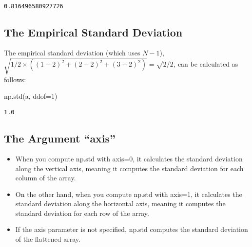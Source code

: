 \documentclass[
  letterpaper,
  DIV=11,
  numbers=noendperiod]{scrreprt}
\newenvironment{Shaded}{\begin{snugshade}}{\end{snugshade}}
\newcommand{\DecValTok}[1]{\textcolor[rgb]{0.68,0.00,0.00}{#1}}
\newcommand{\NormalTok}[1]{\textcolor[rgb]{0.00,0.23,0.31}{#1}}
\newcommand{\OperatorTok}[1]{\textcolor[rgb]{0.37,0.37,0.37}{#1}}
\providecommand{\tightlist}{%
  \setlength{\itemsep}{0pt}\setlength{\parskip}{0pt}}\usepackage{longtable,booktabs,array}
\begin{document}
\begin{verbatim}
0.816496580927726
\end{verbatim}

\hypertarget{the-empirical-standard-deviation}{%
\subsection{The Empirical Standard
Deviation}\label{the-empirical-standard-deviation}}

The empirical standard deviation (which uses \(N-1\)),
\(\sqrt{1/2 \times \left( (1-2)^2 + (2-2)^2 + (3-2)^2 \right)} = \sqrt{2/2}\),
can be calculated as follows:

\begin{Shaded}
\begin{Highlighting}[]
\NormalTok{np.std(a, ddof}\OperatorTok{=}\DecValTok{1}\NormalTok{)}
\end{Highlighting}
\end{Shaded}

\begin{verbatim}
1.0
\end{verbatim}

\hypertarget{the-argument-axis}{%
\subsection{The Argument ``axis''}\label{the-argument-axis}}

\begin{tcolorbox}[enhanced jigsaw, rightrule=.15mm, opacityback=0, colframe=quarto-callout-note-color-frame, opacitybacktitle=0.6, toptitle=1mm, arc=.35mm, colbacktitle=quarto-callout-note-color!10!white, coltitle=black, toprule=.15mm, leftrule=.75mm, titlerule=0mm, title=\textcolor{quarto-callout-note-color}{\faInfo}\hspace{0.5em}{Axes along which the standard deviation is computed}, bottomrule=.15mm, breakable, bottomtitle=1mm, left=2mm, colback=white]

\begin{itemize}
\tightlist
\item
  When you compute np.std with axis=0, it calculates the standard
  deviation along the vertical axis, meaning it computes the standard
  deviation for each column of the array.
\item
  On the other hand, when you compute np.std with axis=1, it calculates
  the standard deviation along the horizontal axis, meaning it computes
  the standard deviation for each row of the array.
\item
  If the axis parameter is not specified, np.std computes the standard
  deviation of the flattened array.
\end{itemize}

\end{tcolorbox}
\end{document}
